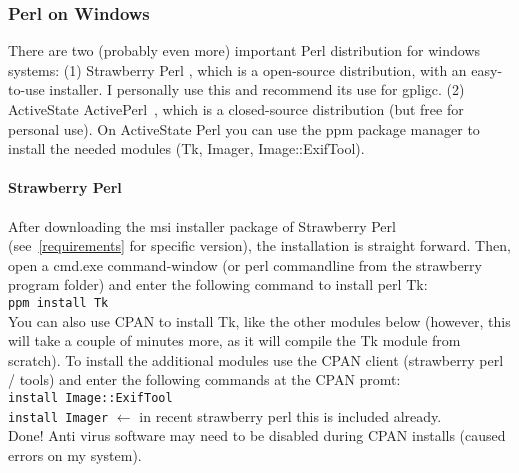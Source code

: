 

\subsubsection{Perl on Windows}
\label{perl}
There are two (probably even more) important Perl distribution for windows systems:
(1) Strawberry Perl \cite{strawberryperl}, which is a open-source distribution, with an easy-to-use installer.
I personally use this and recommend its use for gpligc.
(2) ActiveState ActivePerl~\cite{activeperl}, which is a closed-source distribution (but free for personal use).
On ActiveState Perl you can use the ppm package manager to install the needed modules (Tk, Imager, Image::ExifTool).

\paragraph{Strawberry Perl}
After downloading the msi installer package of Strawberry Perl (see~\ref{requirements} for specific version),
the installation is straight forward.
Then, open a cmd.exe command-window (or perl commandline from the strawberry program folder) and enter the following
command to install perl Tk:\\
\texttt{ppm install Tk}\\
You can also use CPAN to install Tk, like the other modules below (however, this will take a couple of minutes more, as it will compile the Tk module from scratch).
To install the additional modules use the CPAN client (strawberry perl / tools) and enter the following commands
at the CPAN promt:\\
\texttt{install Image::ExifTool}\\
\texttt{install Imager}  $\leftarrow$ in recent strawberry perl this is included already.\\
Done!
Anti virus software may need to be disabled during CPAN installs (caused errors on my system).


